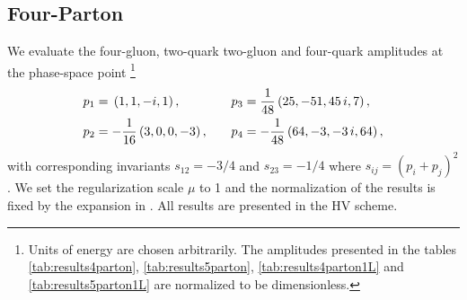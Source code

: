 \subsection{Four-Parton}


We evaluate the four-gluon, two-quark two-gluon and four-quark
amplitudes at the phase-space point%
\footnote{Units of energy are chosen arbitrarily.
  The amplitudes presented in the tables
  \ref{tab:results4parton}, \ref{tab:results5parton}, 
  \ref{tab:results4parton1L} and \ref{tab:results5parton1L}
  are normalized to be dimensionless.
}
%
\begin{equation}
  \begin{aligned}[c]
    p_1 &= \vphantom{\frac{1}{48}}\left(1,1,-i,1\right), \\
    p_2 &= -\frac{1}{16}\left(3,0,0,-3\right), \\
  \end{aligned}
  \qquad
  \begin{aligned}[c]
    p_3 &= \frac{1}{48}\left(25,-51,45\,i,7\right),\\
    p_4 &= -\frac{1}{48}\left(64,-3,-3\,i, 64\right), \\
  \end{aligned}
  \label{eq:EvalPoint4}
\end{equation}
with corresponding invariants $s_{12}=-3/4$ and $s_{23}=-1/4$ 
where $s_{ij}=(p_i+p_j)^2$.
%
We set the regularization scale $\mu$ to 1 and the normalization
of the results is fixed by the expansion in 
. All results are presented
in the HV scheme.
%
